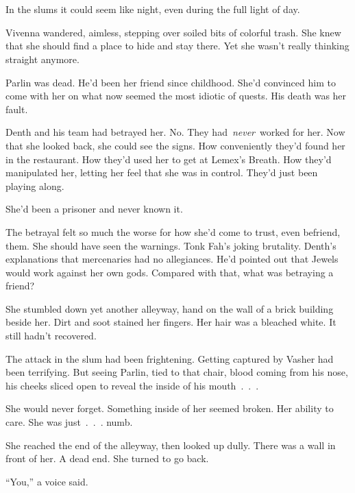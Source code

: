 \chapter{}

In the slums it could seem like night, even during the full light of day.

Vivenna wandered, aimless, stepping over soiled bits of colorful trash. She knew that she should find a place to hide and stay there. Yet she wasn’t really thinking straight anymore.

Parlin was dead. He’d been her friend since childhood. She’d convinced him to come with her on what now seemed the most idiotic of quests. His death was her fault.

Denth and his team had betrayed her. No. They had~\textit{never}~worked for her. Now that she looked back, she could see the signs. How conveniently they’d found her in the restaurant. How they’d used her to get at Lemex’s Breath. How they’d manipulated her, letting her feel that she was in control. They’d just been playing along.

She’d been a prisoner and never known it.

The betrayal felt so much the worse for how she’d come to trust, even befriend, them. She should have seen the warnings. Tonk Fah’s joking brutality. Denth’s explanations that mercenaries had no allegiances. He’d pointed out that Jewels would work against her own gods. Compared with that, what was betraying a friend?

She stumbled down yet another alleyway, hand on the wall of a brick building beside her. Dirt and soot stained her fingers. Her hair was a bleached white. It still hadn’t recovered.

The attack in the slum had been frightening. Getting captured by Vasher had been terrifying. But seeing Parlin, tied to that chair, blood coming from his nose, his cheeks sliced open to reveal the inside of his mouth~.~.~.

She would never forget. Something inside of her seemed broken. Her ability to care. She was just~.~.~. numb.

She reached the end of the alleyway, then looked up dully. There was a wall in front of her. A dead end. She turned to go back.

“You,” a voice said.


